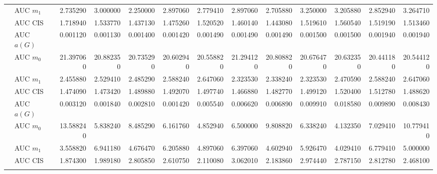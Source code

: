 \begin{table}[htbp]
\begin{tabular}{llrrrrrrrrrrr}
    & AUC $m_1$ & 2.735290 & 3.000000 & 2.250000 & 2.897060 & 2.779410 & 2.897060 & 2.705880 & 3.250000 & 3.205880 & 2.852940 & 3.264710 \\
    & AUC CIS & 1.718940 & 1.533770 & 1.437130 & 1.475260 & 1.520520 & 1.460140 & 1.443080 & 1.519610 & 1.560540 & 1.519190 & 1.513460 \\
    \addlinespace
    \multirow{4}{*}{degree} & AUC $a(G)$ & 0.001120 & 0.001130 & 0.001400 & 0.001420 & 0.001490 & 0.001490 & 0.001490 & 0.001500 & 0.001500 & 0.001940 & 0.001940 \\
    & AUC $m_0$ & 21.397060 & 20.882350 & 20.735290 & 20.602940 & 20.558820 & 21.294120 & 20.808820 & 20.676470 & 20.632350 & 20.441180 & 20.544120 \\
    & AUC $m_1$ & 2.455880 & 2.529410 & 2.485290 & 2.588240 & 2.647060 & 2.323530 & 2.338240 & 2.323530 & 2.470590 & 2.588240 & 2.647060 \\
    & AUC CIS & 1.474090 & 1.473420 & 1.489880 & 1.492070 & 1.497740 & 1.466880 & 1.482770 & 1.499120 & 1.520400 & 1.512780 & 1.488620 \\
    \addlinespace
    \multirow{4}{*}{random} & AUC $a(G)$ & 0.003120 & 0.001840 & 0.002810 & 0.001420 & 0.005540 & 0.006620 & 0.006890 & 0.009910 & 0.018580 & 0.009890 & 0.008430 \\
    & AUC $m_0$ & 13.588240 & 5.838240 & 8.485290 & 6.161760 & 4.852940 & 6.500000 & 9.808820 & 6.338240 & 4.132350 & 7.029410 & 10.779410 \\
    & AUC $m_1$ & 3.558820 & 6.941180 & 4.676470 & 6.205880 & 4.897060 & 6.397060 & 4.602940 & 5.926470 & 4.029410 & 6.779410 & 5.000000 \\
    & AUC CIS & 1.874300 & 1.989180 & 2.805850 & 2.610750 & 2.110080 & 3.062010 & 2.183860 & 2.974440 & 2.787150 & 2.812780 & 2.468100 \\
    \addlinespace
    \bottomrule
  \end{tabular}
\end{table}

